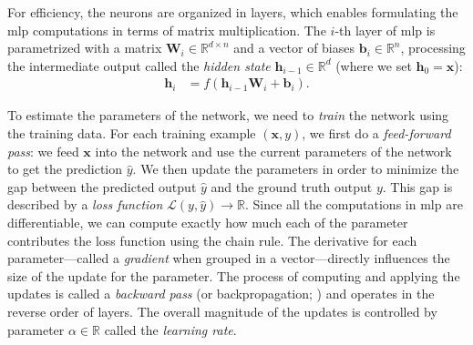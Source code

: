For efficiency, the neurons are organized in layers, which enables formulating the \ac{mlp} computations in terms of matrix multiplication. The $i$-th layer of \ac{mlp} is parametrized with a matrix $\mathbf{W}_i \in \mathbb{R}^{d\times n}$ and a vector of biases $\mathbf{b}_i \in \mathbb{R}^{n}$, processing the intermediate output called the \textit{hidden state} $\mathbf{h}_{i-1} \in \mathbb{R}^{d}$ (where we set $\textbf{h}_0 = \textbf{x}$):
\begin{align}
    \mathbf{h}_i & = f(\mathbf{h}_{i-1} \mathbf{W}_i + \mathbf{b}_i).
\end{align}

To estimate the parameters of the network, we need to \emph{train} the network using the training data. For each training example $(\mathbf{x}, y)$, we first do a \emph{feed-forward pass}: we feed $\mathbf{x}$ into the network and use the current parameters of the network to get the prediction $\hat{y}$. We then update the parameters in order to minimize the gap between the predicted output $\hat{y}$ and the ground truth output $y$. This gap is described by a \textit{loss function} $\mathcal{L}(y, \hat{y}) \rightarrow \mathbb{R}$.
Since all the computations in \ac{mlp} are differentiable, we can compute exactly how much each of the parameter contributes the loss function using the chain rule. The derivative for each parameter---called a \emph{gradient} when grouped in a vector---directly influences the size of the update for the parameter. The process of computing and applying the updates is called a \emph{backward pass} (or backpropagation; \citealp{kelley1960gradient,rumelhart1986learning}) and operates in the reverse order of layers. The overall magnitude of the updates is controlled by parameter $\alpha \in \mathbb{R}$ called the \emph{learning rate}.

